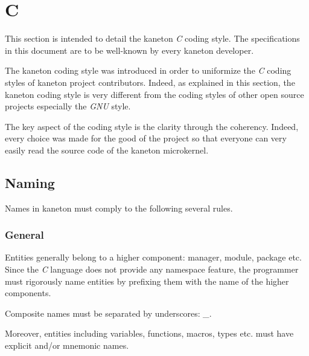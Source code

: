 %
%
%
%
%
%

%
%

\section{C}
\label{section:c}

This section is intended to detail the kaneton \textit{C} coding style.
The specifications in this document are to be well-known by every kaneton
developer.

The kaneton coding style was introduced in order to uniformize the \textit{C}
coding styles of kaneton project contributors. Indeed, as explained in this
section, the kaneton coding style is very different from the coding styles
of other open source projects especially the \textit{GNU} style.

The key aspect of the coding style is the clarity through the coherency.
Indeed, every choice was made for the good of the project so that everyone
can very easily read the source code of the kaneton microkernel.

%
%

\subsection{Naming}

Names in kaneton must comply to the following several rules.


\subsubsection{General}

Entities generally belong to a higher component: manager, module, package etc.
Since the \textit{C} language does not provide any namespace feature, the
programmer must rigorously name entities by prefixing them with the name
of the higher components.

Composite names must be separated by underscores: \textit{\_}.

Moreover, entities including variables, functions, macros, types etc. must
have explicit and/or mnemonic names.

